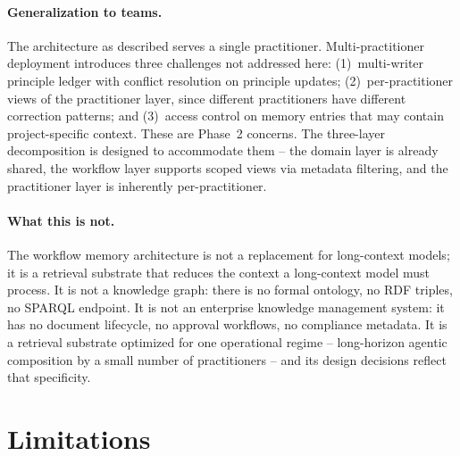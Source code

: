 \documentclass[11pt]{article}
\begin{document}
\paragraph{Generalization to teams.}
The architecture as described serves a single practitioner.
Multi-practitioner deployment introduces three challenges not addressed here: (1)~multi-writer principle ledger with conflict resolution on principle updates; (2)~per-practitioner views of the practitioner layer, since different practitioners have different correction patterns; and (3)~access control on memory entries that may contain project-specific context.
These are Phase~2 concerns.
The three-layer decomposition is designed to accommodate them -- the domain layer is already shared, the workflow layer supports scoped views via metadata filtering, and the practitioner layer is inherently per-practitioner.

\paragraph{What this is not.}
The workflow memory architecture is not a replacement for long-context models; it is a retrieval substrate that reduces the context a long-context model must process.
It is not a knowledge graph: there is no formal ontology, no RDF triples, no SPARQL endpoint.
It is not an enterprise knowledge management system: it has no document lifecycle, no approval workflows, no compliance metadata.
It is a retrieval substrate optimized for one operational regime -- long-horizon agentic composition by a small number of practitioners -- and its design decisions reflect that specificity.


\section{Limitations}
\label{sec:limitations}
\end{document}
